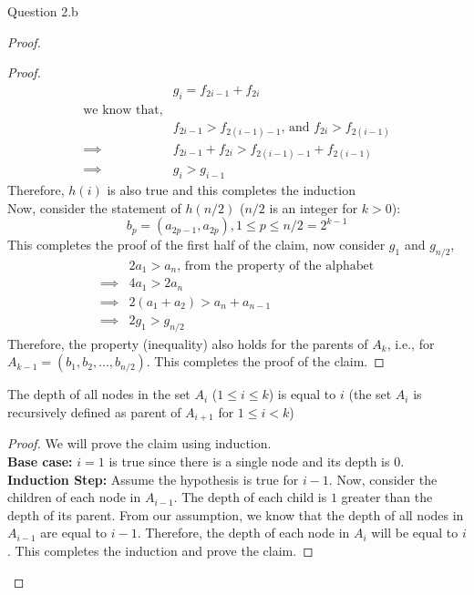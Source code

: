 \begin{solution}{Question 2.b}
\begin{proof}
\begin{proof}
\begin{equation}
\begin{split}
                    &g_i=f_{2i-1}+f_{2i}\\
                    \text{we know that,}&\\
                    &f_{2i-1}>f_{2(i-1)-1}\text{, and }f_{2i}>f_{2(i-1)}\\
                    \implies &f_{2i-1}+f_{2i}>f_{2(i-1)-1}+f_{2(i-1)}\\
                    \implies &g_i>g_{i-1}
                \end{split}
            \end{equation}
            Therefore, $h(i)$ is also true and this completes the induction\\
            Now, consider the statement of $h(n/2)$ ($n/2$ is an integer for $k>0$):
            \begin{equation}
                b_p=(a_{2p-1}, a_{2p}), 1\leq p\leq n/2=2^{k-1}
            \end{equation}
            This completes the proof of the first half of the claim, now consider $g_1$ and $g_{n/2}$,
            \begin{equation}
                \begin{split}
                    &2a_1>a_n\text{, from the property of the alphabet}\\
                    \implies &4a_1>2a_n\\
                    \implies &2(a_1+a_2)>a_n+a_{n-1}\\
                    \implies &2g_1>g_{n/2}
                \end{split}
            \end{equation}
            Therefore, the property (inequality) also holds for the parents of $A_k$, i.e., for $A_{k-1}=(b_1, b_2, \ldots, b_{n/2})$. This completes the proof of the claim.
        \end{proof}
        \begin{claim}\label{claim:depth}
            The depth of all nodes in the set $A_i$ ($1\leq i\leq k$) is equal to $i$ (the set $A_i$ is recursively defined as parent of $A_{i+1}$ for $1\leq i < k$)
        \end{claim}
        \begin{proof}
            We will prove the claim using induction.\\
            \textbf{Base case:} $i=1$ is true since there is a single node and its depth is $0$.\\
            \textbf{Induction Step:} Assume the hypothesis is true for $i-1$. Now, consider the children of each node in $A_{i-1}$. The depth of each child is $1$ greater than the depth of its parent. From our assumption, we know that the depth of all nodes in $A_{i-1}$ are equal to $i-1$. Therefore, the depth of each node in $A_i$ will be equal to $i$. This completes the induction and prove the claim.

\end{proof}
\end{proof}
\end{solution}
